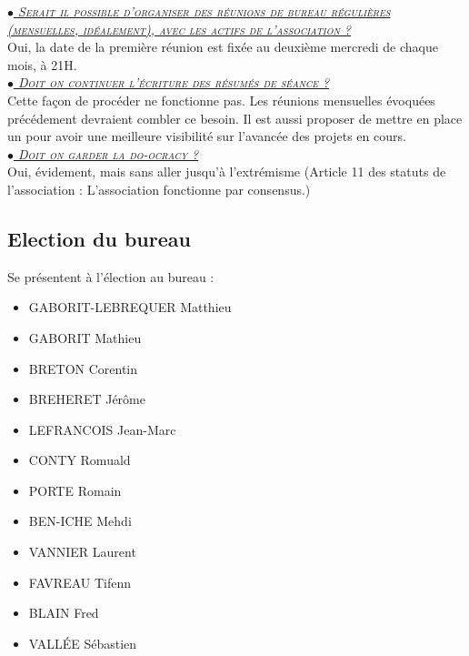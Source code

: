 \documentclass[a4paper, 11pt]{article}
\newcommand\question[2]{\noindent\ul{\textit{\textsc{$\bullet$ #1}}}\\#2\\}
\begin{document}
\question{Serait il possible d'organiser des réunions de bureau régulières
(mensuelles, idéalement), avec les actifs de l'association ?}{Oui, la date de
la première réunion est fixée au deuxième mercredi de chaque mois, à 21H.}
\question{Doit on continuer l'écriture des résumés de séance ?}{Cette façon de
procéder ne fonctionne pas. Les réunions mensuelles évoquées précédement
devraient combler ce besoin. Il est aussi proposer de mettre en place un
\og{index des projets}\fg{} pour avoir une meilleure visibilité sur l'avancée des
projets en cours.}
\question{Doit on garder la do-ocracy ?}{Oui, évidement, mais sans aller jusqu'à
l'extrémisme (Article 11 des statuts de l'association : L'association fonctionne
par consensus.)}

\subsection{Election du bureau}

Se présentent à l'élection au bureau :

\begin{itemize}
  \item GABORIT-LEBREQUER Matthieu
	\item GABORIT Mathieu
	\item BRETON Corentin
	\item BREHERET Jérôme
	\item LEFRANCOIS Jean-Marc
	\item CONTY Romuald
	\item PORTE Romain
	\item BEN-ICHE Mehdi
	\item VANNIER Laurent
	\item FAVREAU Tifenn
	\item BLAIN Fred
	\item VALLÉE Sébastien
\end{itemize}
\end{document}
